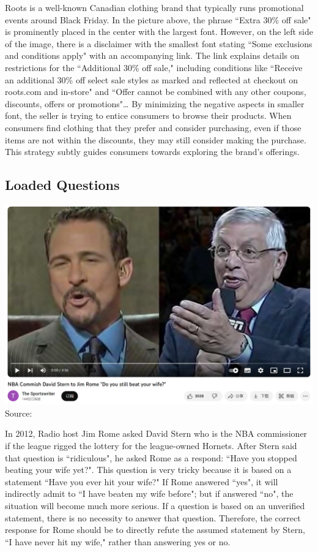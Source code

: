\documentclass[12pt, a4paper]{article}
\begin{document}
Roots is a well-known Canadian clothing brand that typically runs promotional events around Black Friday. In the picture above, the phrase ``Extra 30\% off sale" is prominently placed in the center with the largest font. However, on the left side of the image, there is a disclaimer with the smallest font stating ``Some exclusions and conditions apply" with an accompanying link. The link explains details on restrictions for the ``Additional 30\% off sale," including conditions like ``Receive an additional 30\% off select sale styles as marked and reflected at checkout on roots.com and in-store" and ``Offer cannot be combined with any other coupons, discounts, offers or promotions"…
By minimizing the negative aspects in smaller font, the seller is trying to entice consumers to browse their products. When consumers find clothing that they prefer and consider purchasing, even if those items are not within the discounts, they may still consider making the purchase. This strategy subtly guides consumers towards exploring the brand's offerings.


\subsection*{Loaded Questions}
\includegraphics[width=1\textwidth]{Figure.5.3.png}
Source: \cite{NBA_2012}

In 2012, Radio host Jim Rome asked David Stern who is the NBA commissioner if the league rigged the lottery for the league-owned Hornets. After Stern said that question is ``ridiculous", he asked Rome as a respond: ``Have you stopped beating your wife yet?".
This question is very tricky because it is based on a statement ``Have you ever hit your wife?" If Rome answered ``yes", it will indirectly admit to ``I have beaten my wife before"; but if answered ``no", the situation will become much more serious. If a question is based on an unverified statement, there is no necessity to answer that question. Therefore, the correct response for Rome should be to directly refute the assumed statement by Stern, ``I have never hit my wife," rather than answering yes or no.
\end{document}
